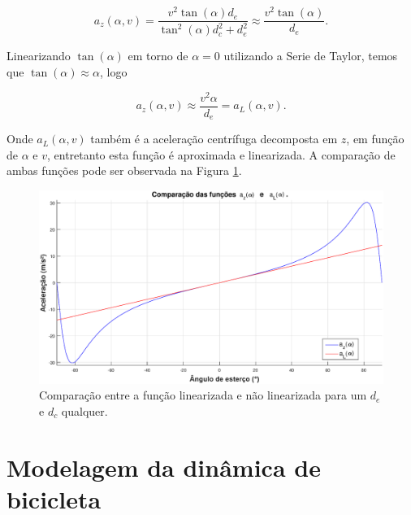             \begin{equation}
                a_z(\alpha, v) = \frac{v^2\tan(\alpha)d_e}{\tan^2(\alpha)d_c^2+d_e^2} \approx \frac{v^2\tan(\alpha)}{d_e}.
                \label{eq:azdoidão}
            \end{equation}
            
            Linearizando $\tan(\alpha)$ em torno de $\alpha = 0$ utilizando a Serie de Taylor, temos que $\tan(\alpha) \approx \alpha$, logo
            
            \begin{equation}
               a_z(\alpha, v) \approx \frac{v^2\alpha}{d_e} = a_L(\alpha, v).
               \label{eq:LinearizaçãoAlpha}
            \end{equation}
            
            Onde $a_L(\alpha, v)$ também é a aceleração centrífuga decomposta em $z$, em função de $\alpha$ e $v$, entretanto esta função é aproximada e linearizada. A comparação de ambas funções pode ser observada na Figura \ref{img:comparativolinearização}.
    
    		\begin{figure}[H]
                \centering
                \includegraphics[width=12cm]{Imagens/ComparativoLinearizacao.eps}
                \caption{Comparação entre a função linearizada e não linearizada para um $d_e$ e $d_c$ qualquer.}
                \label{img:comparativolinearização}
            \end{figure}
            
            
            
	\section{Modelagem da dinâmica de bicicleta}\label{sec:modelagembicicleta}
        
